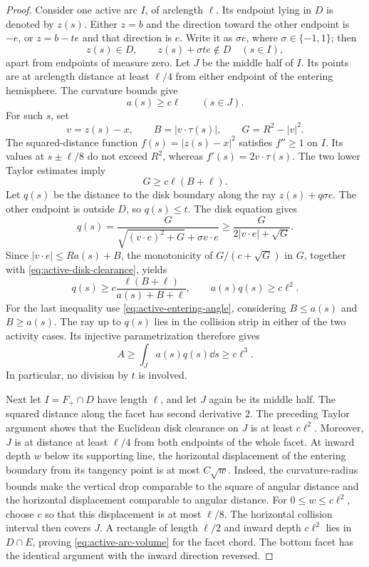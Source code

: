 \begin{proof}
Consider one active arc $I$, of arclength $\ell$. Its endpoint lying
in $D$ is denoted by $z(s)$. Either $z=b$ and the direction toward the
other endpoint is $-e$, or $z=b-te$ and that direction is $e$.
Write it as $\sigma e$, where $\sigma\in\{-1,1\}$; then
\[
                z(s)\in D,\qquad z(s)+\sigma te\notin D
                         \quad(s\in I),
\]
apart from endpoints of measure zero. Let $J$ be the middle half of
$I$. Its points are at arclength distance at least $\ell/4$ from
either endpoint of the entering hemisphere. The curvature bounds give
\begin{equation}\label{eq:active-entering-angle}
                         a(s)\ge c\ell\qquad(s\in J).
\end{equation}
For such $s$, set
\[
 v=z(s)-x,\qquad B=|v\cdot\tau(s)|,\qquad G=R^2-|v|^2.
\]
The squared-distance function $f(s)=|z(s)-x|^2$ satisfies $f''\ge1$
on $I$. Its values at $s\pm\ell/8$ do not exceed $R^2$, whereas
$f'(s)=2v\cdot\tau(s)$. The two lower Taylor estimates imply
\begin{equation}\label{eq:active-disk-clearance}
                              G\ge c\ell(B+\ell).
\end{equation}
Let $q(s)$ be the distance to the disk boundary along the ray
$z(s)+q\sigma e$. The other endpoint is outside $D$, so $q(s)\le t$.
The disk equation gives
\[
 q(s)=\frac{G}{\sqrt{(v\cdot e)^2+G}+\sigma v\cdot e}
       \ge\frac{G}{2|v\cdot e|+\sqrt G}.
\]
Since $|v\cdot e|\le Ra(s)+B$, the monotonicity of
$G/(c+\sqrt G)$ in $G$, together with
\eqref{eq:active-disk-clearance}, yields
\[
 q(s)\ge c\frac{\ell(B+\ell)}{a(s)+B+\ell},\qquad
                         a(s)q(s)\ge c\ell^2.
\]
For the last inequality use \eqref{eq:active-entering-angle}, considering
$B\le a(s)$ and $B\ge a(s)$. The ray up to $q(s)$ lies in the
collision strip in either of the two activity cases. Its injective
parametrization therefore gives
\begin{equation}\label{eq:active-arc-volume}
                A\ge\int_Ja(s)q(s)\dd s\ge c\ell^3.
\end{equation}
In particular, no division by $t$ is involved.

Next let $I=F_+\cap D$ have length $\ell$, and let $J$ again be its
middle half. The squared distance along the facet has second derivative
$2$. The preceding Taylor argument shows that the Euclidean disk
clearance on $J$ is at least $c\ell^2$. Moreover, $J$ is at distance
at least $\ell/4$ from both endpoints of the whole facet. At inward
depth $w$ below its supporting line, the horizontal displacement of
the entering boundary from its tangency point is at most $C\sqrt w$.
Indeed, the curvature-radius bounds make the vertical drop comparable
to the square of angular distance and the horizontal displacement
comparable to angular distance. For $0\le w\le c\ell^2$, choose $c$
so that this displacement is at most $\ell/8$. The horizontal collision
interval then covers $J$. A rectangle of length $\ell/2$ and inward
depth $c\ell^2$ lies in $D\cap E$, proving
\eqref{eq:active-arc-volume} for the facet chord. The bottom facet has
the identical argument with the inward direction reversed.


\end{proof}

